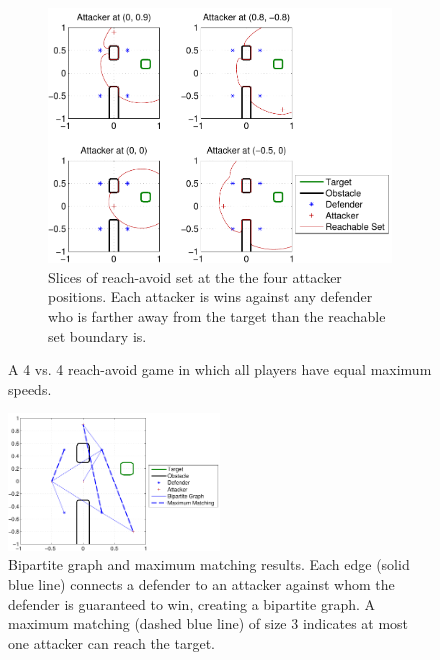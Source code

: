 \begin{figure}[h]
	\begin{subfigure}{0.5\textwidth}
	\centering
	\includegraphics[width=\textwidth]{"fig/fixed attacker 1"}
	\caption{Slices of reach-avoid set at the the four attacker positions. Each attacker is wins against any defender who is farther away from the target than the reachable set boundary is.}
	\label{subfig:fixed_a_1}
	\end{subfigure}
\caption{A 4 vs. 4 reach-avoid game in which all players have equal maximum speeds.}
\label{fig:results1}
\end{figure}

\begin{figure}[h]
	\centering
	\includegraphics[width=0.5\textwidth]{"fig/max matching 1"}
	\caption{Bipartite graph and maximum matching results. Each edge (solid blue line) connects a defender to an attacker against whom the defender is guaranteed to win, creating a bipartite graph. A maximum matching (dashed blue line) of size 3 indicates at most one attacker can reach the target.}
	\label{fig:max_matching_1}
	
\end{figure}

